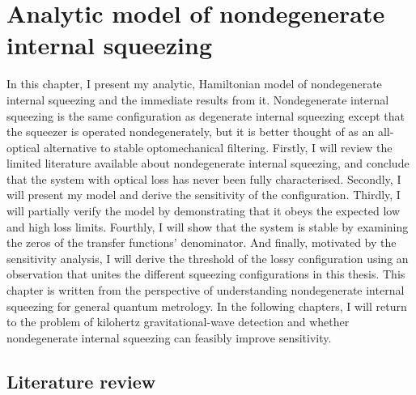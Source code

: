 \chapter{Analytic model of nondegenerate internal squeezing} %
\label{chp:nIS_analytics}





In this chapter, I present my analytic, Hamiltonian model of nondegenerate internal squeezing and the immediate results from it. Nondegenerate internal squeezing is the same configuration as degenerate internal squeezing except that the squeezer is operated nondegenerately, but it is better thought of as an all-optical alternative to stable optomechanical filtering. Firstly, I will review the limited literature available about nondegenerate internal squeezing, and conclude that the system with optical loss has never been fully characterised. Secondly, I will present my model and derive the sensitivity of the configuration. Thirdly, I will partially verify the model by demonstrating that it obeys the expected low and high loss limits. Fourthly, I will show that the system is stable by examining the zeros of the transfer functions' denominator. And finally, motivated by the sensitivity analysis, I will derive the threshold of the lossy configuration using an observation that unites the different squeezing configurations in this thesis. 
This chapter is written from the perspective of understanding nondegenerate internal squeezing for general quantum metrology. In the following chapters, I will return to the problem of kilohertz gravitational-wave detection and whether nondegenerate internal squeezing can feasibly improve sensitivity. 


\section{Literature review}

